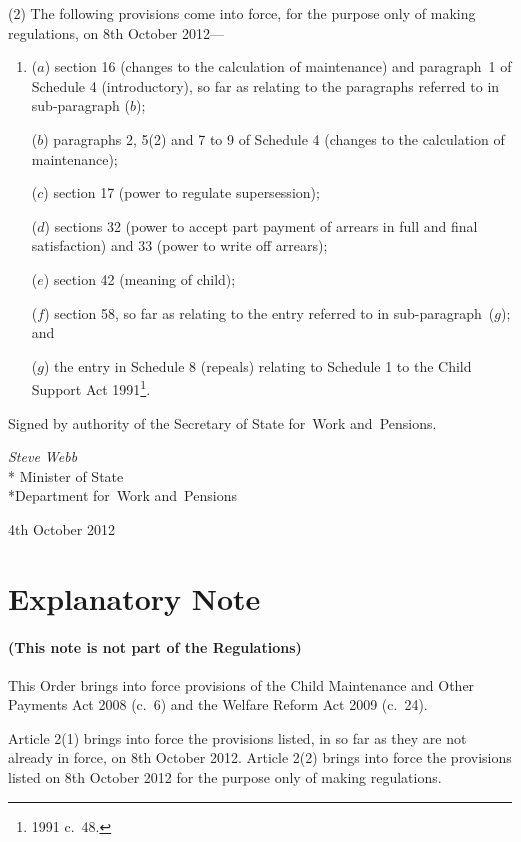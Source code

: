 \documentclass[12pt,a4paper]{article}
\begin{document}
(2) The following provisions come into force, for the purpose only of making regulations, on 8th October 2012—
\begin{enumerate}\item[]
($a$) section 16 (changes to the calculation of maintenance) and paragraph~1 of Schedule 4 (introductory), so far as relating to the paragraphs referred to in sub-paragraph ($b$);

($b$) paragraphs 2, 5(2) and 7 to 9 of Schedule 4 (changes to the calculation of maintenance);

($c$) section 17 (power to regulate supersession);

($d$) sections 32 (power to accept part payment of arrears in full and final satisfaction) and 33 (power to write off arrears);

($e$) section 42 (meaning of child);

($f$) section 58, so far as relating to the entry referred to in sub-paragraph~($g$); and

($g$) the entry in Schedule 8 (repeals) relating to Schedule 1 to the Child Support Act 1991\footnote{1991 c.~48.}.
\end{enumerate}

\bigskip

\pagebreak[3]

Signed 
by authority of the 
Secretary of State for~Work and~Pensions.

{\raggedleft
\emph{Steve Webb}\\*
Minister
of State\\*Department 
for~Work and~Pensions

}

4th October 2012

\small

\part{Explanatory Note}

\renewcommand\parthead{— Explanatory Note}

\subsection*{(This note is not part of the Regulations)}

This Order brings into force provisions of the Child Maintenance and Other Payments Act 2008 (c.~6) and the Welfare Reform Act 2009 (c.~24).

Article 2(1) brings into force the provisions listed, in so far as they are not already in force, on 8th October 2012. Article 2(2) brings into force the provisions listed on 8th October 2012 for the purpose only of making regulations. 
\end{document}
